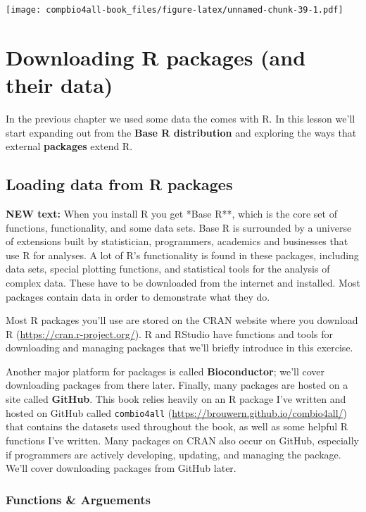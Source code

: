\documentclass[
]{book}
\begin{document}
\texttt{[image: compbio4all-book\_files/figure-latex/unnamed-chunk-39-1.pdf]}

\hypertarget{downloading-r-packages-and-their-data}{%
\chapter{Downloading R packages (and their data)}\label{downloading-r-packages-and-their-data}}

In the previous chapter we used some data the comes with R. In this lesson we'll start expanding out from the \textbf{Base R distribution} and exploring the ways that external \textbf{packages} extend R.

\hypertarget{loading-data-from-r-packages}{%
\section{Loading data from R packages}\label{loading-data-from-r-packages}}

\textbf{NEW text:}
When you install R you get *Base R**, which is the core set of functions, functionality, and some data sets. Base R is surrounded by a universe of extensions built by statistician, programmers, academics and businesses that use R for analyses. A lot of R's functionality is found in these packages, including data sets, special plotting functions, and statistical tools for the analysis of complex data. These have to be downloaded from the internet and installed. Most packages contain data in order to demonstrate what they do.

Most R packages you'll use are stored on the CRAN website where you download R (\url{https://cran.r-project.org/}). R and RStudio have functions and tools for downloading and managing packages that we'll briefly introduce in this exercise.

Another major platform for packages is called \textbf{Bioconductor}; we'll cover downloading packages from there later. Finally, many packages are hosted on a site called \textbf{GitHub}. This book relies heavily on an R package I've written and hosted on GitHub called \texttt{combio4all} (\url{https://brouwern.github.io/combio4all/}) that contains the datasets used throughout the book, as well as some helpful R functions I've written. Many packages on CRAN also occur on GitHub, especially if programmers are actively developing, updating, and managing the package. We'll cover downloading packages from GitHub later.

\hypertarget{functions-arguements}{%
\subsection{Functions \& Arguements}\label{functions-arguements}}
\end{document}
